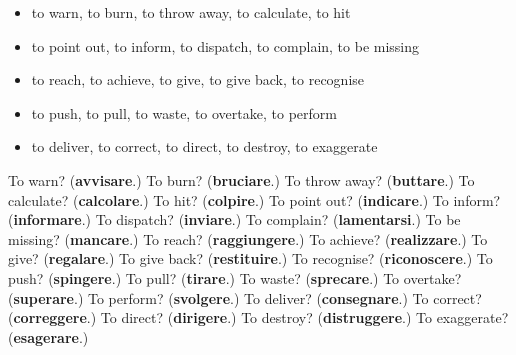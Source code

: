 \begin{itemize}
\raggedright
  \item to warn, to burn, to throw away, to calculate, to hit
  \item to point out, to inform, to dispatch, to complain, to be missing
  \item to reach, to achieve, to give, to give back, to recognise
  \item to push, to pull, to waste, to overtake, to perform
  \item to deliver, to correct, to direct, to destroy, to exaggerate
\end{itemize}

\begin{tcolorbox}[breakable,colback=teal!4,colframe=teal!35!black,title={Before you move on}]
To warn? (\textbf{avvisare}.) To burn? (\textbf{bruciare}.) To throw away? (\textbf{buttare}.) To calculate? (\textbf{calcolare}.) To hit? (\textbf{colpire}.) To point out? (\textbf{indicare}.) To inform? (\textbf{informare}.) To dispatch? (\textbf{inviare}.) To complain? (\textbf{lamentarsi}.) To be missing? (\textbf{mancare}.) To reach? (\textbf{raggiungere}.) To achieve? (\textbf{realizzare}.) To give? (\textbf{regalare}.) To give back? (\textbf{restituire}.) To recognise? (\textbf{riconoscere}.) To push? (\textbf{spingere}.) To pull? (\textbf{tirare}.) To waste? (\textbf{sprecare}.) To overtake? (\textbf{superare}.) To perform? (\textbf{svolgere}.) To deliver? (\textbf{consegnare}.) To correct? (\textbf{correggere}.) To direct? (\textbf{dirigere}.) To destroy? (\textbf{distruggere}.) To exaggerate? (\textbf{esagerare}.)
\end{tcolorbox}
